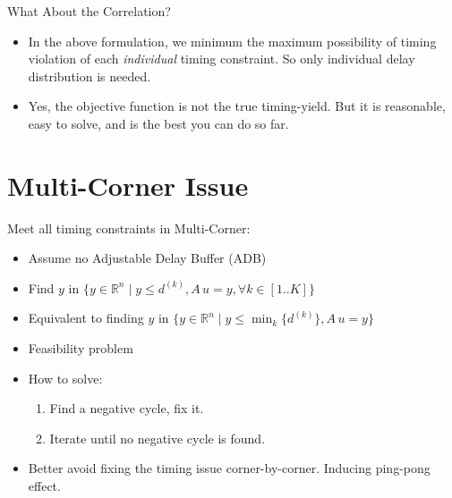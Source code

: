 \documentclass[10pt,ignorenonframetext,mathserif]{beamer}
\providecommand{\tightlist}{%
  \setlength{\itemsep}{0pt}\setlength{\parskip}{0pt}}
\begin{document}
\begin{frame}{What About the Correlation?}

\begin{itemize}
\tightlist
\item
  In the above formulation, we minimum the maximum possibility of timing
  violation of each \emph{individual} timing constraint. So only
  individual delay distribution is needed.
\item
  Yes, the objective function is not the true timing-yield. But it is
  reasonable, easy to solve, and is the best you can do so far.
\end{itemize}

\end{frame}

\section{Multi-Corner Issue}\label{multi-corner-issue}

\begin{frame}{Meet all timing constraints in Multi-Corner:}

\begin{itemize}
\tightlist
\item
  Assume no Adjustable Delay Buffer (ADB)
\item
  Find \(y\) in
  \(\{y \in \mathbb{R}^n \mid y \leq d^{(k)}, A\,u = y, \forall k\in[1..K]\}\)
\item
  Equivalent to finding \(y\) in
  \(\{y \in \mathbb{R}^n \mid y \leq \min_k\{ d^{(k)}\}, A\,u = y \}\)
\item
  Feasibility problem
\item
  How to solve:

  \begin{enumerate}
  \def\labelenumi{\arabic{enumi}.}
  \tightlist
  \item
    Find a negative cycle, fix it.
  \item
    Iterate until no negative cycle is found.
  \end{enumerate}
\item
  Better avoid fixing the timing issue corner-by-corner. Inducing
  ping-pong effect.
\end{itemize}

\end{frame}
\end{document}
